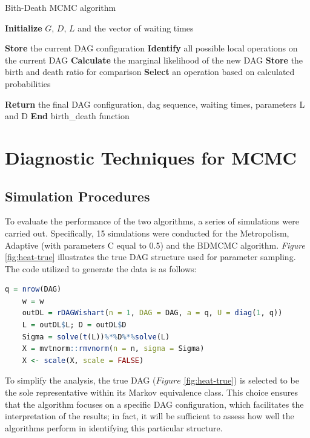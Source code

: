 \documentclass{report}
\begin{document}
\begin{algorithm}[H]
	\caption{Bith-Death MCMC algorithm}
	\begin{algorithmic}[1]
		\State \textbf{Initialize} $G$, $D$, $L$ and the vector of waiting times
		
		\State \textbf{Store} the current DAG configuration
		\State \textbf{Identify} all possible local operations on the current DAG
		\State \textbf{Calculate} the marginal likelihood of the new DAG
		\State \textbf{Store} the birth and death ratio for comparison
		\EndIf
		\EndFor
		\State \textbf{Select} an operation based on calculated probabilities
		\EndWhile
		
		\State \textbf{Return} the final DAG configuration, dag sequence, waiting times, parameters L and D
		\State \textbf{End} birth\_death function
		
	\end{algorithmic}
\end{algorithm}


\section{Diagnostic Techniques for MCMC}

\subsection{Simulation Procedures}

To evaluate the performance of the two algorithms, a series of simulations were carried out. Specifically, 15 simulations were conducted for the Metropolism, Adaptive (with parameters C equal to 0.5) and the BDMCMC algorithm. \textit{Figure} \ref{fig:heat-true} illustrates the true DAG structure used for parameter sampling. The code utilized to generate the data is as follows:

\begin{lstlisting}[language=R]
	q = nrow(DAG)
	w = w
	outDL = rDAGWishart(n = 1, DAG = DAG, a = q, U = diag(1, q))
	L = outDL$L; D = outDL$D
	Sigma = solve(t(L))%*%D%*%solve(L)
	X = mvtnorm::rmvnorm(n = n, sigma = Sigma)
	X <- scale(X, scale = FALSE)
\end{lstlisting}

To simplify the analysis, the true DAG ($\textit{Figure}$ \ref{fig:heat-true}) is selected to be the sole representative within its Markov equivalence class. This choice ensures that the algorithm focuses on a specific DAG configuration, which facilitates the interpretation of the results; in fact, it will be sufficient to assess how well the algorithms perform in identifying this particular structure.
\end{document}
